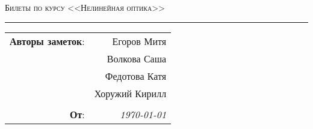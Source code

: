 
\begin{center}
    \LARGE \textsc{Билеты по курсу <<Нелинейная оптика>>}
\end{center}

\hrule

\phantom{42}

\begin{flushright}
    \begin{tabular}{rr}
        \textbf{Авторы заметок}: 
        & Егоров Митя \\
        & Волкова Саша \\
        &  Федотова Катя \\ 
        & Хоружий Кирилл \\
        & \\
        \textbf{От}: &
        \textit{\today}\\
    \end{tabular}
\end{flushright}

\thispagestyle{empty}
\tableofcontents
\newpage
